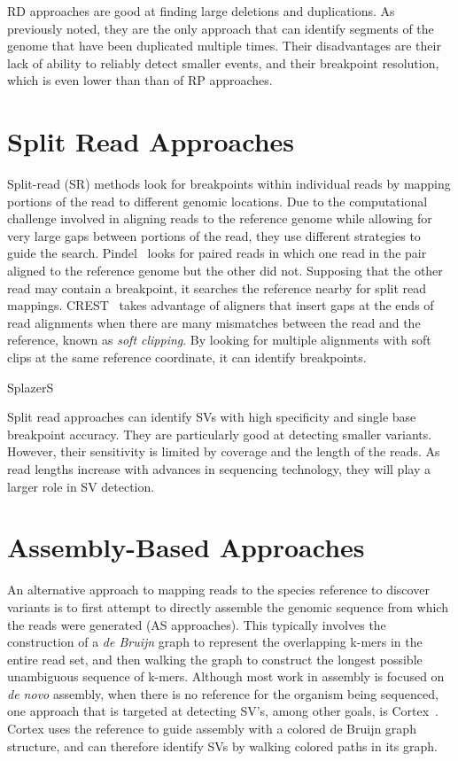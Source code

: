 RD approaches are good at finding large deletions and duplications. As previously noted, they are the only approach that can identify segments of the genome that have been duplicated multiple times. Their disadvantages are their lack of ability to reliably detect smaller events, and their breakpoint resolution, which is even lower than than of RP approaches.

\section{Split Read Approaches}

Split-read (SR) methods look for breakpoints within individual reads by mapping portions of the read to different genomic locations. Due to the computational challenge involved in aligning reads to the reference genome while allowing for very large gaps between portions of the read, they use different strategies to guide the search. Pindel~\cite{Ye:2009p2} looks for paired reads in which one read in the pair aligned to the reference genome but the other did not. Supposing that the other read may contain a breakpoint, it searches the reference nearby for split read mappings. CREST~\cite{Wang:2011p1607} takes advantage of aligners that insert gaps at the ends of read alignments when there are many mismatches between the read and the reference, known as \emph{soft clipping}. By looking for multiple alignments with soft clips at the same reference coordinate, it can identify breakpoints. 

SplazerS~\cite{Emde:2012fb}

Split read approaches can identify SVs with high specificity and single base breakpoint accuracy. They are particularly good at detecting smaller variants. However, their sensitivity is limited by coverage and the length of the reads. As read lengths increase with advances in sequencing technology, they will play a larger role in SV detection.

\section{Assembly-Based Approaches}

An alternative approach to mapping reads to the species reference to discover variants is to first attempt to directly assemble the genomic sequence from which the reads were generated (AS approaches). This typically involves the construction of a \emph{de Bruijn} graph to represent the overlapping k-mers in the entire read set, and then walking the graph to construct the longest possible unambiguous sequence of k-mers. Although most work in assembly is focused on \emph{de novo} assembly, when there is no reference for the organism being sequenced, one approach that is targeted at detecting SV's, among other goals, is Cortex~\cite{Iqbal:2012p1837}. Cortex uses the reference to guide assembly with a colored de Bruijn graph structure, and can therefore identify SVs by walking colored paths in its graph.

